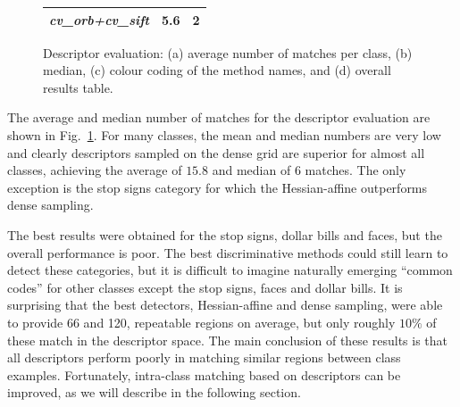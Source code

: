 \documentclass[journal]{IEEEtran}
\begin{document}
\begin{figure}[h]
\begin{center}
{\begin{tabular}{|l|l|l|}
\textit{cv\_orb+cv\_sift}         &  5.6 & 2\\
\hline
\end{tabular}
} %
\caption{Descriptor evaluation: (a) average number of matches per class,
(b) median,
(c) colour coding of the method names, and
(d) overall results table.}
\label{fig:results2}
\end{center}
\end{figure}
%
The average and median number of matches for the descriptor evaluation
are shown in Fig.~\ref{fig:results2}.
For many classes, the mean and median numbers are very low and
clearly descriptors sampled on the dense grid are superior for
almost all classes, achieving the average of $15.8$ and median of $6$ matches.
The only exception is the stop signs category for
which the Hessian-affine outperforms dense sampling.

The best results were obtained for the stop signs, dollar bills and
faces, but the overall performance is poor.
The best discriminative methods could still learn to detect these
categories, but it is difficult to imagine naturally emerging
``common codes'' for other classes except the stop signs, faces and
dollar bills.
It is surprising that the best detectors, Hessian-affine and dense
sampling, were able to provide 66 and 120, repeatable regions on average, but
only roughly $10\%$ of these match in the descriptor space.
The main conclusion of these results is that all descriptors perform
poorly in matching similar regions between class examples.
Fortunately, intra-class matching based on descriptors can be improved,
as we will describe in the following section.

\end{document}
